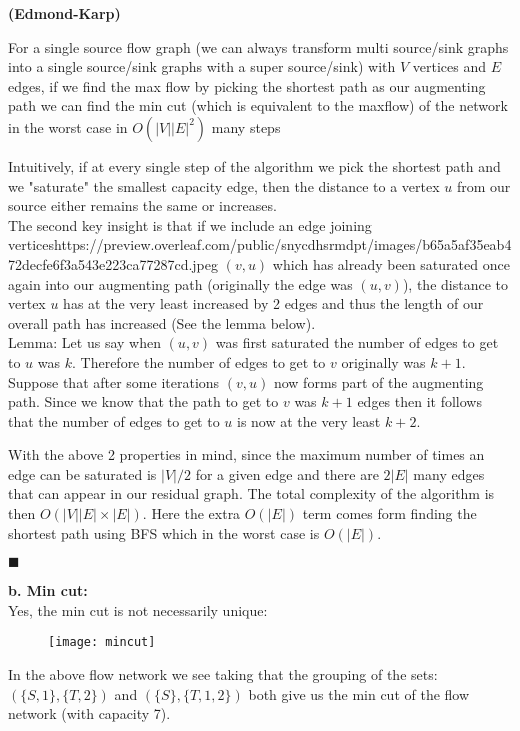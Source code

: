 \documentclass[12pt]{article}
\renewcommand{\qed}{\hfill$\blacksquare$}
\renewenvironment{proof}{\begin{addmargin}[1em]{0em}\begin{newproof}}{\end{newproof}\end{addmargin}\qed}
\newenvironment{problem}[2][Problem]{\begin{trivlist}
\item[\hskip \labelsep {\bfseries #1}\hskip \labelsep {\bfseries #2.}]}{\end{trivlist}}
\begin{document}
\begin{problem}{3: Use the shortest path from source to drain as our augmenting path}\textbf{(Edmond-Karp)}

For a single source flow graph (we can always transform multi source/sink graphs into a single source/sink graphs with a super source/sink) with $V$ vertices and $E$ edges,  if we find the max flow by picking the shortest path as our augmenting path we can find the min cut (which is equivalent to the maxflow) of the network in the worst case in $O(|V||E|^2)$ many steps\\


\begin{proof}
Intuitively, if at every single step of the algorithm we pick the shortest path and we "saturate" the smallest capacity edge, then the distance to a vertex $u$ from our source either remains the same or increases. \\

The second key insight is that if we include an edge joining verticeshttps://preview.overleaf.com/public/snycdhsrmdpt/images/b65a5af35eab472decfe6f3a543e223ca77287cd.jpeg $(v,u)$ which has already been saturated once again into our augmenting path (originally the edge was $(u,v)$), the distance to vertex $u$ has at the very least increased by 2 edges and thus the length of our overall path has increased (See the lemma below).\\ 

Lemma: Let us say when $(u,v)$ was first saturated the number of edges to get to $u$ was $k$. Therefore the number of edges to get to $v$ originally was $k+1$. Suppose that after some iterations $(v,u)$ now forms part of the augmenting path. Since we know that the path to get to $v$ was $k+1$ edges then it follows that the number of edges to get to $u$ is now at the very least $k+2$. 


With the above 2 properties in mind, since the maximum number of times an edge can be saturated is $|V|/2$ for a given edge and there are $2|E|$ many edges that can appear in our residual graph. The total complexity of the algorithm is then $O(|V||E|\times |E|)$. Here the extra $O(|E|)$ term comes form finding the shortest path using BFS which in the worst case is $O(|E|)$. 


\end{proof}


\textbf{b. Min cut:}\\

Yes, the min cut is not necessarily unique:

\begin{figure}[H]
 \centering
  \texttt{[image: mincut]}
\end{figure}
In the above flow network we see taking that the grouping of the sets: $(\{S,1\}, \{T,2\})$ and $(\{S\}, \{T,1,2\})$ both give us the min cut of the flow network (with capacity 7).
\end{problem}
\end{document}

